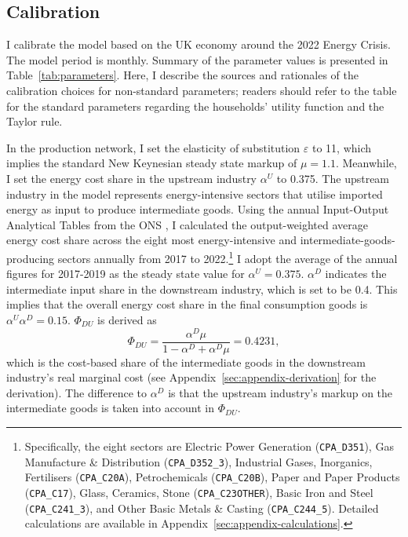 \documentclass[a4paper, 12pt]{article}
\theoremstyle{definition*}
\begin{document}
\subsection{Calibration}
I calibrate the model based on the UK economy around the 2022 Energy Crisis.
The model period is monthly.
Summary of the parameter values is presented in Table~\ref{tab:parameters}.
Here, I describe the sources and rationales of the calibration choices for non-standard parameters; readers should refer to the table for the standard parameters regarding the households' utility function and the Taylor rule.

In the production network, I set the elasticity of substitution $\varepsilon$ to 11, which implies the standard New Keynesian steady state markup of $\mu = 1.1$.
Meanwhile, I set the energy cost share in the upstream industry $\alpha^U$ to 0.375.
The upstream industry in the model represents energy-intensive sectors that utilise imported energy as input to produce intermediate goods.
Using the annual Input-Output Analytical Tables from the ONS \citep{ons2025uk}, I calculated the output-weighted average energy cost share across the eight most energy-intensive and intermediate-goods-producing sectors annually from 2017 to 2022.\footnote{Specifically, the eight sectors are Electric Power Generation (\texttt{CPA\_D351}), Gas Manufacture \& Distribution (\texttt{CPA\_D352\_3}), Industrial Gases, Inorganics, Fertilisers (\texttt{CPA\_C20A}), Petrochemicals (\texttt{CPA\_C20B}), Paper and Paper Products (\texttt{CPA\_C17}), Glass, Ceramics, Stone (\texttt{CPA\_C23OTHER}), Basic Iron and Steel (\texttt{CPA\_C241\_3}), and Other Basic Metals \& Casting (\texttt{CPA\_C244\_5}). Detailed calculations are available in Appendix~\ref{sec:appendix-calculations}.}
I adopt the average of the annual figures for 2017-2019 as the steady state value for $\alpha^U = 0.375.$
$\alpha^D$ indicates the intermediate input share in the downstream industry, which is set to be 0.4.
This implies that the overall energy cost share in the final consumption goods is $\alpha^U\alpha^D = 0.15$.
$\Phi_{DU}$ is derived as
\begin{equation}
  \Phi_{DU} = \frac{\alpha^D\mu}{1 - \alpha^D + \alpha^D\mu} = 0.4231,
\end{equation}
which is the cost-based share of the intermediate goods in the downstream industry's real marginal cost (see Appendix~\ref{sec:appendix-derivation} for the derivation).
The difference to $\alpha^D$ is that the upstream industry's markup on the intermediate goods is taken into account in $\Phi_{DU}$.
\end{document}
